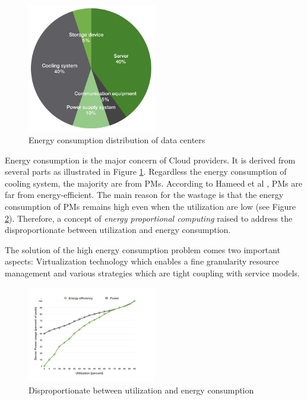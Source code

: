 \begin{figure}
	\centering
	\includegraphics[width=0.5\textwidth]{pics/energyConsumption.png}
	\caption{Energy consumption distribution of data centers \cite{Rong:2016js}}
	\label{fig:consumption}
\end{figure} 

Energy consumption \cite{Kaplan:up01fR-k} is the major concern of Cloud providers. It is derived from several parts as illustrated in Figure \ref{fig:consumption}. 
Regardless the energy consumption of cooling system, 
the majority are from PMs.
According to Hameed et al \cite{Hameed:2016cma}, PMs are far from energy-efficient. 
The main reason for the wastage is that the energy consumption of PMs remains high even when the utilization are low (see Figure \ref{fig:unproportional}). 
Therefore, a concept of \emph{energy proportional computing} \cite{Barroso:2007jt} raised to address the disproportionate between utilization and energy consumption. 

The solution of the high energy consumption problem comes two important aspects: Virtualization technology which enables a fine granularity resource management and various strategies which are tight coupling with service models. 



\begin{figure}[H]
	\centering
	\includegraphics[width=0.5\textwidth]{pics/util.png}
	\caption{Disproportionate between utilization and energy consumption \cite{Barroso:2007jt}}
	\label{fig:unproportional}
\end{figure} 


